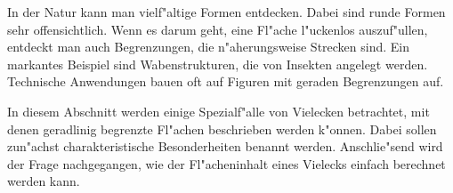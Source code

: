 



\begin{MIntro}
In der Natur kann man vielf"altige Formen entdecken. Dabei sind runde Formen
sehr offensichtlich.  Wenn es darum geht, eine Fl"ache l"uckenlos auszuf"ullen, 
entdeckt man auch Begrenzungen, die n"aherungsweise Strecken sind. Ein markantes
Beispiel sind Wabenstrukturen, die von Insekten angelegt werden.
Technische Anwendungen bauen oft auf Figuren mit geraden Begrenzungen auf.

In diesem Abschnitt werden einige Spezialf"alle von Vielecken betrachtet, mit
denen geradlinig begrenzte Fl"achen beschrieben werden k"onnen. 
Dabei sollen zun"achst charakteristische Besonderheiten benannt werden.
Anschlie"send wird der Frage nachgegangen, wie der Fl"acheninhalt eines 
Vielecks einfach berechnet werden kann. 
\end{MIntro}


